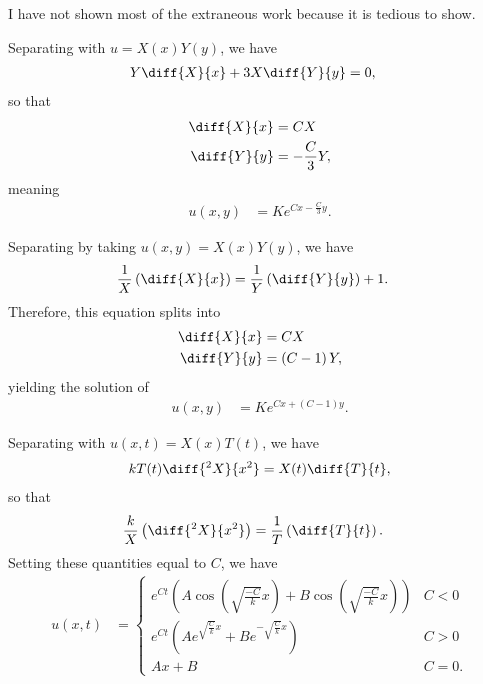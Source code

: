 \documentclass[10pt]{mypackage}
\begin{document}
\RaggedRight
I have not shown most of the extraneous work because it is tedious to show.
\begin{solution}[12.1, Problem 2]
  Separating with $u=X(x)Y(y)$, we have
  \begin{align*}
    Y\diff{X}{x} + 3X\diff{Y}{y} &= 0,
  \end{align*}
  so that
  \begin{align*}
    \diff{X}{x} &= CX\\
    \diff{Y}{y} &= -\frac{C}{3}Y,
  \end{align*}
  meaning
  \begin{align*}
    u\left( x,y \right) &= Ke^{Cx - \frac{C}{3}y}.
  \end{align*}
\end{solution}
\begin{solution}[12.1, Problem 4]
  Separating by taking $u\left( x,y \right) = X(x)Y(y)$, we have
  \begin{align*}
    \frac{1}{X}\left( \diff{X}{x} \right) &= \frac{1}{Y}\left( \diff{Y}{y} \right) + 1.
  \end{align*}
  Therefore, this equation splits into
  \begin{align*}
    \diff{X}{x} &= CX\\
    \diff{Y}{y} &= \left( C-1 \right) Y,
  \end{align*}
  yielding the solution of
  \begin{align*}
    u\left( x,y \right) &= Ke^{Cx + \left( C-1 \right)y}.
  \end{align*}
\end{solution}
\begin{solution}[12.1, Problem 10]
  Separating with $u\left( x,t \right) = X(x)T(t)$, we have
  \begin{align*}
    kT(t)\diff{^2X}{x^2} = X(t)\diff{T}{t},
  \end{align*}
  so that
  \begin{align*}
    \frac{k}{X} \left( \diff{^2X}{x^2} \right) &= \frac{1}{T}\left( \diff{T}{t} \right).
  \end{align*}
  Setting these quantities equal to $C$, we have
  \begin{align*}
    u\left( x,t \right)  &= \begin{cases}
      e^{Ct}\left( A\cos\left( \sqrt{\frac{-C}{k}}x \right) + B\cos\left( \sqrt{\frac{-C}{k}}x \right) \right) & C < 0\\
      e^{Ct}\left( Ae^{\sqrt{\frac{C}{k}}x} + Be^{-\sqrt{\frac{C}{k}}x} \right) & C > 0\\
      Ax + B & C = 0.
    \end{cases}
  \end{align*}
\end{solution}
\end{document}
